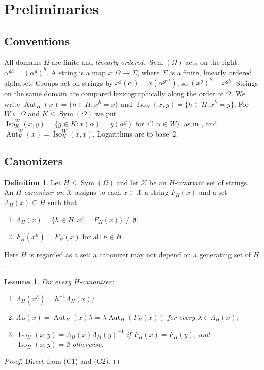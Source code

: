 \documentclass[11pt]{article}
\newenvironment{enumlab}[2][]{\begin{enumerate}\renewcommand{\theenumi}{#1#2{enumi}}%
  \renewcommand{\labelenumi}{(\theenumi)}}{\end{enumerate}}
\theoremstyle{plain}
\newtheorem{lemma}[theorem]{Lemma}
\theoremstyle{definition}
\newtheorem{definition}[theorem]{Definition}
\theoremstyle{remark}
\theoremstyle{named}
\theoremstyle{namedrm}
\newcommand{\Sym}{\operatorname{Sym}}
\newcommand{\Aut}{\operatorname{Aut}}
\newcommand{\Iso}{\operatorname{Iso}}
\begin{document}
\section{Preliminaries}\label{sec:prelim}

\subsection{Conventions}

All domains $\Omega$ are finite and \emph{linearly ordered}. $\Sym(\Omega)$ acts on the right:
$\alpha^{gh}=(\alpha^g)^h$. A string is a map $x\colon\Omega\to\Sigma$, where $\Sigma$ is a finite, linearly
ordered alphabet. Groups act on strings by $x^g(\alpha)=x(\alpha^{g^{-1}})$, so $(x^g)^h=x^{gh}$. Strings on
the same domain are compared lexicographically along the order of $\Omega$. We write
$\Aut_H(x)=\{h\in H:x^h=x\}$ and $\Iso_H(x,y)=\{h\in H:x^h=y\}$. For $W\subseteq\Omega$ and
$K\le\Sym(\Omega)$ we put $\Iso^W_K(x,y)=\{g\in K: x(\alpha)=y(\alpha^g)\text{ for all }\alpha\in W\}$, as
in \cite[\S2]{GNS}, and $\Aut^W_K(x)=\Iso^W_K(x,x)$. Logarithms are to base~2.

\subsection{Canonizers}\label{sec:canonizers}

\begin{definition}\label{def:canonizer}
Let $H\le\Sym(\Omega)$ and let $\mathcal X$ be an $H$-invariant set of strings. An
\emph{$H$-canonizer on $\mathcal X$} assigns to each $x\in\mathcal X$ a string $F_H(x)$ and a set
$\Lambda_H(x)\subseteq H$ such that
\begin{enumlab}[C]{\arabic}
\item $\Lambda_H(x)=\{h\in H:x^h=F_H(x)\}\neq\emptyset$;
\item $F_H(x^h)=F_H(x)$ for all $h\in H$.
\end{enumlab}
Here $H$ is regarded as a set: a canonizer may not depend on a generating set of $H$.
\end{definition}

\begin{lemma}\label{lem:canon-basic}
For every $H$-canonizer:
\begin{enumerate}
\item $\Lambda_H(x^h)=h^{-1}\Lambda_H(x)$;
\item $\Lambda_H(x)=\Aut_H(x)\lambda=\lambda\Aut_H(F_H(x))$ for every $\lambda\in\Lambda_H(x)$;
\item $\Iso_H(x,y)=\Lambda_H(x)\Lambda_H(y)^{-1}$ if $F_H(x)=F_H(y)$, and $\Iso_H(x,y)=\emptyset$ otherwise.
\end{enumerate}
\end{lemma}
\begin{proof}
Direct from (C1) and (C2).
\end{proof}
\end{document}
